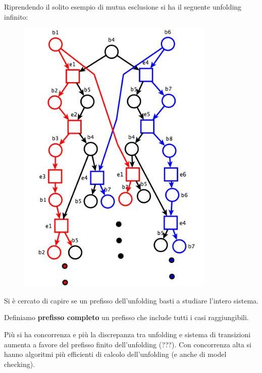 \documentclass[a4paper,12pt, oneside]{book}
\begin{document}
\begin{esempio}
  Riprendendo il solito esempio di mutua esclusione si ha il seguente unfolding
  infinito:
  \begin{figure}[H]
    \centering
    \includegraphics[scale = 0.45]{img/unf.jpg} 
  \end{figure}
\end{esempio}
Si è cercato di capire se un prefisso dell'unfolding basti a studiare l'intero
sistema.
\begin{definizione}
  Definiamo \textbf{prefisso completo} un prefisso che include tutti i casi
  raggiungibili.
\end{definizione}
Più si ha concorrenza e più la discrepanza tra unfolding e sistema di
transizioni aumenta a favore del prefisso finito dell'unfolding (???). Con
concorrenza alta si hanno algoritmi più efficienti di calcolo dell'unfolding (e
anche di model checking).
\end{document}
